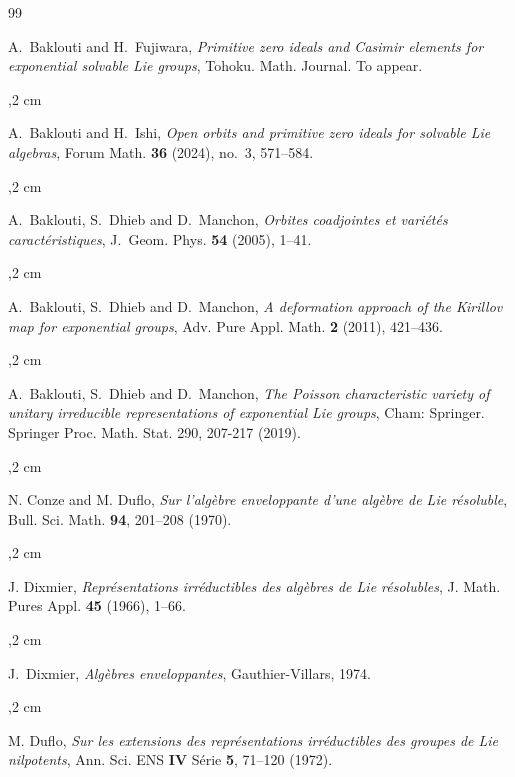 \documentclass[11pt]{amsart}
\theoremstyle{plain}
\theoremstyle{definition}
\theoremstyle{remark}
\begin{document}
	\begin{thebibliography}{99}
		
		 A.~Baklouti and H.~Fujiwara, \emph{Primitive zero ideals and Casimir elements for exponential solvable Lie groups}, Tohoku. Math. Journal.  To appear.
		
		,2 cm
		
		
		 A.~Baklouti and H.~Ishi, \emph{Open orbits and primitive zero ideals for solvable Lie algebras}, Forum Math. \textbf{36} (2024), no.~3, 571--584.
		
		,2 cm
		
		
		 A.~Baklouti, S.~Dhieb and D.~Manchon, \emph{Orbites coadjointes et vari\'et\'es caract\'eristiques}, J.~Geom. Phys. \textbf{54} (2005), 1--41.
		
		
		,2 cm
		
		
		 A.~Baklouti, S.~Dhieb and D.~Manchon, \emph{A deformation approach of the Kirillov map for exponential groups}, Adv. Pure Appl. Math. \textbf{2} (2011), 421--436.
		
		
		,2 cm
		
		
		 A.~Baklouti, S.~Dhieb and D.~Manchon, 
		\emph{The Poisson characteristic variety of unitary irreducible representations of exponential Lie groups}, Cham: Springer. Springer Proc. Math. Stat. 290, 207-217 (2019).
		
		
		,2 cm
		
		
		N. Conze and M. Duflo, \textsl{Sur l'alg\`ebre enveloppante d'une alg\`ebre de Lie r\'esoluble}, Bull. Sci. Math. \textbf{94}, 201--208 (1970).
		
		
		,2 cm
		
		
		 J. Dixmier,
		\textit{Repr\'{e}sentations irr\'{e}ductibles des alg\`{e}bres de Lie r\'{e}solubles},
		J. Math. Pures Appl. {\bf 45 }(1966), 1--66.
		
		
		,2 cm
		
		
		
		 J.~Dixmier, \emph{Alg\`ebres enveloppantes}, Gauthier-Villars, 1974.
		
		
		,2 cm
		
		
		M. Duflo, \textsl{Sur les extensions des repr\'esentations irr\'eductibles des groupes de Lie nilpotents}, Ann. Sci. ENS \textbf{IV} S\'erie {\bf 5}, 71--120 (1972).
		

\end{thebibliography}
\end{document}
